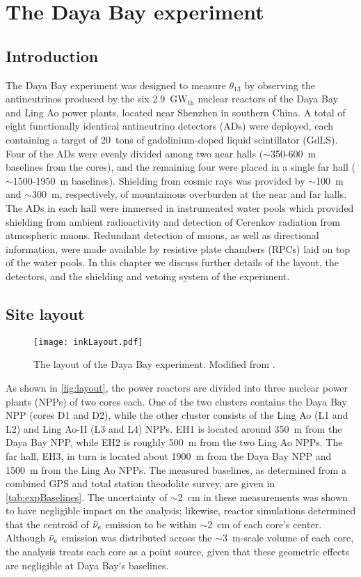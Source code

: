 \documentclass[../thesis.tex]{subfiles}
\begin{document}
\chapter{The Daya Bay experiment}
\label{chap:experim}

\section*{Introduction}

The Daya Bay experiment was designed to measure $\theta_{13}$ by observing the
antineutrinos produced by the six 2.9~GW$_{\text{th}}$ nuclear reactors of the
Daya Bay and Ling Ao power plants, located near Shenzhen in southern China. A
total of eight functionally identical antineutrino detectors (ADs) were
deployed, each containing a target of 20~tons of gadolinium-doped liquid
scintillator (GdLS). Four of the ADs were evenly divided among two near halls
($\sim$350-600~m baselines from the cores), and the remaining four were placed
in a single far hall ($\sim$1500-1950~m baselines). Shielding from cosmic rays
was provided by $\sim$100~m and $\sim$300~m, respectively, of mountainous
overburden at the near and far halls. The ADs in each hall were immersed in
instrumented water pools which provided shielding from ambient radioactivity and
detection of Cerenkov radiation from atmospheric muons. Redundant detection of
muons, as well as directional information, were made available by resistive
plate chambers (RPCs) laid on top of the water pools. In this chapter we discuss
further details of the layout, the detectors, and the shielding and vetoing
system of the experiment.

\section{Site layout}
\label{sec:expLayout}

\begin{figure}[ht]
  \texttt{[image: inkLayout.pdf]}
  \caption{The layout of the Daya Bay experiment. Modified from
    \cite{SideBySide}.}
  \label{fig:layout}
\end{figure}

As shown in \autoref{fig:layout}, the power reactors are divided into three
nuclear power plants (NPPs) of two cores each. One of the two clusters contains
the Daya Bay NPP (cores D1 and D2), while the other cluster consists of the Ling
Ao (L1 and L2) and Ling Ao-II (L3 and L4) NPPs. EH1 is located around 350~m from
the Daya Bay NPP, while EH2 is roughly 500~m from the two Ling Ao NPPs. The far
hall, EH3, in turn is located about 1900~m from the Daya Bay NPP and 1500~m from
the Ling Ao NPPs. The measured baselines, as determined from a combined GPS and
total station theodolite survey, are given in \autoref{tab:expBaselines}. The
uncertainty of $\sim$2~cm in these measurements was shown to have negligible
impact on the analysis; likewise, reactor simulations determined that the
centroid of $\bar\nu_e$ emission to be within $\sim$2~cm of each core's
center. Although $\bar\nu_e$ emission was distributed across the $\sim$3~m-scale
volume of each core, the analysis treats each core as a point source, given that
these geometric effects are negligible at Daya Bay's baselines.
\end{document}
